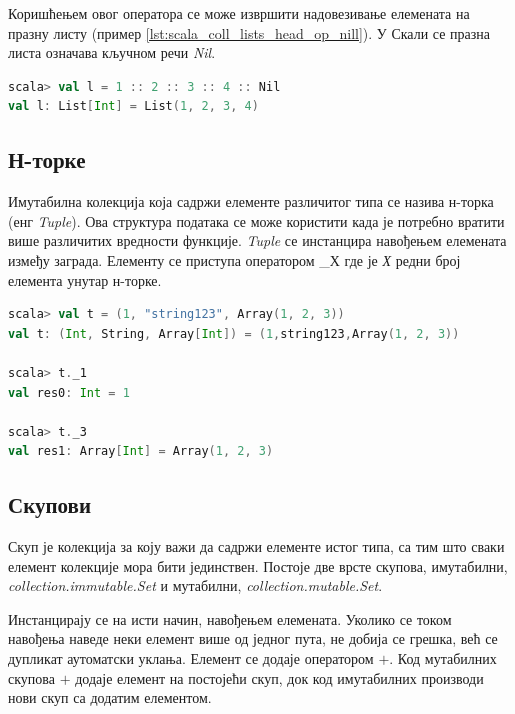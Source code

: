 \documentclass[12pt,oneside]{memoir}
\begin{document}
Коришћењем овог оператора се може извршити надовезивање елемената на празну листу (пример \ref{lst:scala_coll_lists_head_op_nill}). У Скали се празна листа означава кључном речи \textit{Nil}.

\begin{lstlisting}[language=Scala, caption={Додавање елемената на празну листу}, label={lst:scala_coll_lists_head_op_nill}]
scala> val l = 1 :: 2 :: 3 :: 4 :: Nil
val l: List[Int] = List(1, 2, 3, 4)
\end{lstlisting}

\subsection{Н-торке}
\label{subsec:scala_tuple}

Имутабилна колекција која садржи елементе различитог типа се назива н-торка (енг \textit{Tuple}). Ова структура података се може користити када је потребно вратити више различитих вредности функције. \textit{Tuple} се инстанцира навођењем елемената између заграда. Елементу се приступа оператором \_Х где је \textit{Х} редни број елемента унутар н-торке. \cite{scala_prog}

\begin{lstlisting}[language=Scala, caption={Н-торка у Скали}, label={lst:scala_coll_tuple_example}]
scala> val t = (1, "string123", Array(1, 2, 3))
val t: (Int, String, Array[Int]) = (1,string123,Array(1, 2, 3))

scala> t._1
val res0: Int = 1

scala> t._3
val res1: Array[Int] = Array(1, 2, 3)
\end{lstlisting}

\subsection{Скупови}
\label{subsec:scala_sets}

Скуп је колекција за коју важи да садржи елементе истог типа, са тим што сваки елемент колекције мора бити јединствен. Постоје две врсте скупова, имутабилни, \textit{collection.immutable.Set} и мутабилни, \textit{collection.mutable.Set}.

Инстанцирају се на исти начин, навођењем елемената. Уколико се током навођења наведе неки елемент више од једног пута, не добија се грешка, већ се дупликат аутоматски уклања. Елемент се додаје оператором $+$. Код мутабилних скупова $+$ додаје елемент на постојећи скуп, док код имутабилних производи нови скуп са додатим елементом. \cite{scala_prog}
\end{document}
